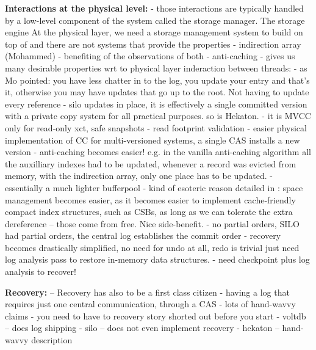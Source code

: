 \vspace{2mm}
{\bf Interactions at the physical level:} 
- those interactions are typically handled by a low-level component of the system called the storage manager. The storage engine
At the physical layer, we need a storage management system to build on top of and there are not systems that provide the properties
- indirection array (Mohammed) 
  - benefiting of the observations of both
  - anti-caching
  - gives us many desirable properties wrt to physical layer inderaction between threads:
  - as Mo pointed: you have less chatter in to the log, you update your entry and that's it, otherwise you may have updates that go up to the root. Not having to update every reference
    - silo updates in place, it is effectively a single committed version with a private copy system for all practical purposes. so is Hekaton.
    - it is MVCC only for read-only xct, safe snapshots
    - read footprint validation
  - easier physical implementation of CC for multi-versioned systems, a single CAS installs a new version
  - anti-caching becomes easier! e.g. in the vanilla anti-caching algorithm all the auxilliary indexes had to be updated, whenever a record was evicted from memory, with the indirection array, only one place has to be updated.
    - essentially a much lighter bufferpool
  - kind of esoteric reason detailed in : space management becomes easier, as it becomes easier to implement cache-friendly compact index structures, such as CSBs, as long as we can tolerate the extra dereference -- those come from free. Nice side-benefit.
- no partial orders, SILO had partial orders, the central log establishes the commit order
  - recovery becomes drastically simplified, no need for undo at all, redo is trivial just need log analysis pass to restore in-memory data structures.
  - need checkpoint plus log analysis to recover!

{\bf Recovery:} 
-- Recovery has also to be a first class citizen
- having a log that requires just one central communication, through a CAS
- lots of hand-wavvy claims
- you need to have to recovery story shorted out before you start
- voltdb -- does log shipping
- silo -- does not even implement recovery
- hekaton -- hand-wavvy description

